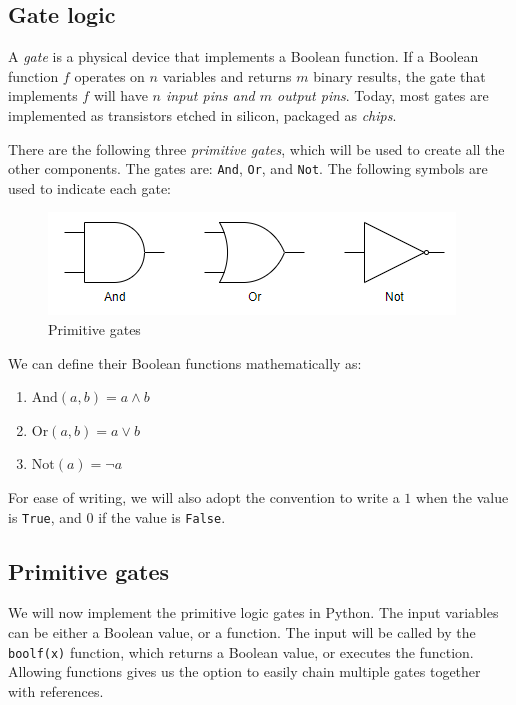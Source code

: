 \documentclass[11pt]{article}
\makeatletter
\def\maxwidth{\ifdim\Gin@nat@width>\linewidth\linewidth
    \else\Gin@nat@width\fi}
\let\Oldincludegraphics\includegraphics
\renewcommand{\includegraphics}[1]{\Oldincludegraphics[width=.8\maxwidth]{#1}}
\providecommand{\tightlist}{%
      \setlength{\itemsep}{0pt}\setlength{\parskip}{0pt}}
\makeatother
\begin{document}
    \hypertarget{gate-logic}{%
\subsection{Gate logic}\label{gate-logic}}

    A \emph{gate} is a physical device that implements a Boolean function.
If a Boolean function \(f\) operates on \(n\) variables and returns
\(m\) binary results, the gate that implements \(f\) will have
\emph{\(n\) input pins and \(m\) output pins}. Today, most gates are
implemented as transistors etched in silicon, packaged as \emph{chips}.

There are the following three \emph{primitive gates}, which will be used
to create all the other components. The gates are: \texttt{And},
\texttt{Or}, and \texttt{Not}. The following symbols are used to
indicate each gate:

\begin{figure}
\centering
\includegraphics{gates1.PNG}
\caption{Primitive gates}
\end{figure}

We can define their Boolean functions mathematically as:

\begin{enumerate}
\def\labelenumi{\arabic{enumi}.}
\tightlist
\item
  \(\text{And}(a,b)=a\land b\)
\item
  \(\text{Or}(a,b)=a\lor b\)
\item
  \(\text{Not}(a)=\lnot a\)
\end{enumerate}

For ease of writing, we will also adopt the convention to write a \(1\)
when the value is \texttt{True}, and \(0\) if the value is
\texttt{False}.

    \hypertarget{primitive-gates}{%
\subsection{Primitive gates}\label{primitive-gates}}

    We will now implement the primitive logic gates in Python. The input
variables can be either a Boolean value, or a function. The input will
be called by the \texttt{boolf(x)} function, which returns a Boolean
value, or executes the function. Allowing functions gives us the option
to easily chain multiple gates together with references.
\end{document}
